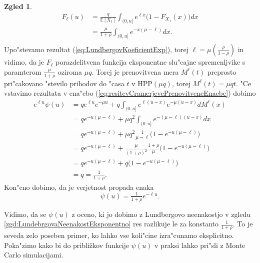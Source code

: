 \documentclass[12pt, a4paper, reqno]{amsart}
\theoremstyle{definition}
\newtheorem{zgled}[definicija]{Zgled}
\theoremstyle{plain}
\newcommand{\E}{\mathbb{E}}
\newcommand{\1}{\mathds{1}}
\begin{document}
\begin{zgled}
                \begin{align*}
                    F_\ell(u)  &= \frac{q}{\E\left[X_1\right]}\int_{(0, u]}e^{\ell x}\bigl(1 - F_{X_1}(x)\bigr)dx \\
                            &= \frac{\mu}{1 + \rho}\int_{(0, u]}e^{-x(\mu - \ell)}dx. \\
                \end{align*}
                Upo"stevamo rezultat (\ref{eq:LundbergovKoeficientExp}), torej 
                $\ell = \mu\left(\tfrac{\rho}{1 - \rho}\right)$ in vidimo, da je $F_\ell$ porazdelitvena 
                funkcija eksponentne slu"cajne spremenljvike s paramterom $\frac{\mu}{1 + \rho}$ oziroma 
                $\mu q$. Torej je prenovitvena mera $M^\ell(t)$ preprosto pri"cakovano "stevilo prihodov do 
                "casa $t$ v $\text{HPP}(\mu q)$, torej $M^\ell(t) = \mu qt$.
                "Ce vstavimo rezultata v ena"cbo (\ref{eq:resitevCramerjevePrenovitveneEnacbe}) dobimo
                \begin{align*}
                    e^{\ell u}\psi(u)   &= qe^{\ell u}e^{-\mu u} + q\int_{(0, u]}e^{\ell(u - x)}e^{-\mu(u - x)}dM^\ell(x)\\
                                        &= qe^{-u(\mu - \ell)} + \mu q^2\int_{(0, u]}e^{-(\mu - \ell)(u - x)}dx \\
                                        &= qe^{-u(\mu - \ell)} + \mu q^2 \frac{1}{\mu - \ell}\biggl(1 - e^{-u(\mu - \ell)}\biggr)\\
                                        &= qe^{-u(\mu - \ell)} + \frac{\mu}{(1 + \rho)^2}\frac{1 + \rho}{\mu}\biggl(1 - e^{-u(\mu - \ell)}\biggr) \\
                                        &= qe^{-u(\mu - \ell)} + q\biggl(1 - e^{-u(\mu - \ell)}\biggr) \\
                                        &= q = \frac{1}{1 + \rho}.
                \end{align*}
                Kon"cno dobimo, da je verjetnost propada enaka
                \begin{equation}
                    \psi(u) =  \tfrac{1}{1+\rho}e^{-\ell u}.
                \label{eq:eksplicitnaVerjetnostPropadaExp}
                \end{equation}
            \end{zgled}

                Vidimo, da se $\psi(u)$ z oceno, ki jo dobimo z Lundbergovo neenakostjo v zgledu \ref{zgd:LundebrgovaNeenakostEksponentno} 
                res razlikuje le za konstanto $\tfrac{1}{1 + \rho}$.
                To je seveda zelo poseben primer, ko lahko vse koli"cine izra"cunamo eksplicitno.
                Poka"zimo kako bi do približkov funkcije $\psi(u)$ v praksi lahko pri"sli z Monte 
                Carlo simulacijami.
            
\end{document}
